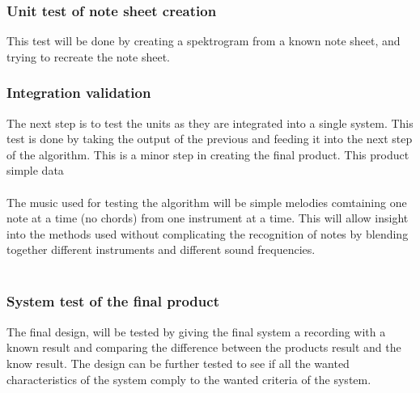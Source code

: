 \subsubsection{Unit test of note sheet creation}
This test will be done by creating a spektrogram from a known note sheet, and trying to recreate the note sheet.
\subsubsection{Integration validation}
The next step is to test the units as they are integrated into a single system.
This test is done by taking the output of the previous and feeding it into the next step of the algorithm. 
This is a minor step in creating the final product.
This product 
simple data 
\\\\
The music used for testing the algorithm will be simple melodies comtaining one note at a time (no chords) from one instrument at a time. This will allow insight into the methods used without complicating the recognition of notes by blending together different instruments and different sound frequencies.\\\\

\subsubsection{System test of the final product}
The final design, will be tested by giving the final system a recording with a known result and comparing the difference between the products result and the know result. The design can be further tested to see if all the wanted characteristics of the system comply to the wanted criteria of the system.



